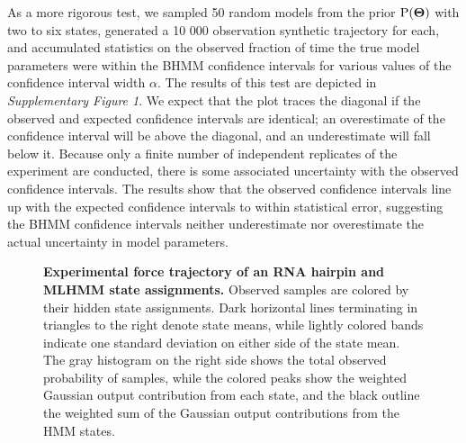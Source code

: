 \documentclass[aps,pre,twocolumn,superscriptaddress,nofootinbib,longbibliography]{revtex4-1}
\newcommand{\bfm}[1]{{\bf #1}}
\renewcommand{\Pr}{\mathrm{P}}
\begin{document}
{As a more rigorous test, we sampled 50 random models from the prior $\Pr(\bfm{\Theta})$ with two to six states, generated a 10 000 observation synthetic trajectory for each, and accumulated statistics on the observed fraction of time the true model parameters were within the BHMM confidence intervals for various values of the confidence interval width $\alpha$.
The results of this test are depicted in \emph{Supplementary Figure 1}. %
We expect that the plot traces the diagonal if the observed and expected confidence intervals are identical; an overestimate of the confidence interval will be above the diagonal, and an underestimate will fall below it.
Because only a finite number of independent replicates of the experiment are conducted, there is some associated uncertainty with the observed confidence intervals.
The results show that the observed confidence intervals line up with the expected confidence intervals to within statistical error, suggesting the BHMM confidence intervals neither underestimate nor overestimate the actual uncertainty in model parameters.



\begin{figure}[tbp]
\noindent
{}
\caption{{\bf Experimental force trajectory of %
{\color{red} an RNA} hairpin and MLHMM state assignments.}
Observed samples are colored by their hidden state assignments.
Dark horizontal lines terminating in triangles to the right denote state means, while lightly colored bands indicate one standard deviation on either side of the state mean.
The gray histogram on the right side shows the total observed probability of samples, while the colored peaks show the weighted Gaussian output contribution from each state, and the black outline the weighted sum of the Gaussian output contributions from the HMM states.
\label{figure:p5ab-observed-trajectory}}
\end{figure}

}
\end{document}
